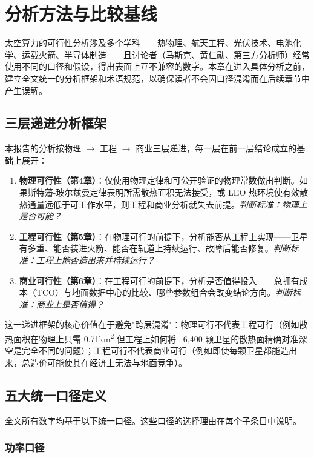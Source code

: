
\section{分析方法与比较基线}

太空算力的可行性分析涉及多个学科——热物理、航天工程、光伏技术、电池化学、运载火箭、半导体制造——且讨论者（马斯克、黄仁勋、第三方分析师）经常使用不同的口径和假设，得出表面上互不兼容的数字。本章在进入具体分析之前，建立全文统一的分析框架和术语规范，以确保读者不会因口径混淆而在后续章节中产生误解。

\subsection{三层递进分析框架}

本报告的分析按物理 $\to$ 工程 $\to$ 商业三层递进，每一层在前一层结论成立的基础上展开：

\begin{enumerate}[leftmargin=*]
    \item \textbf{物理可行性（第4章）}：仅使用物理定律和可公开验证的物理常数做出判断。如果斯特藩-玻尔兹曼定律表明所需散热面积无法接受，或 LEO 热环境使有效散热通量远低于可工作水平，则工程和商业分析就失去前提。\emph{判断标准：物理上是否可能？}
    \item \textbf{工程可行性（第5章）}：在物理可行的前提下，分析能否从工程上实现——卫星有多重、能否装进火箭、能否在轨道上持续运行、故障后能否修复。\emph{判断标准：工程上能否造出来并持续运行？}
    \item \textbf{商业可行性（第6章）}：在工程可行的前提下，分析是否值得投入——总拥有成本（TCO）与地面数据中心的比较、哪些参数组合会改变结论方向。\emph{判断标准：商业上是否值得？}
\end{enumerate}

这一递进框架的核心价值在于避免"跨层混淆"：物理可行不代表工程可行（例如散热面积在物理上只需 0.71\;km\textsuperscript{2} 但工程上如何将 ~6,400 颗卫星的散热面精确对准深空是完全不同的问题）；工程可行不代表商业可行（例如即使每颗卫星都能造出来，总造价可能使其在经济上无法与地面竞争）。

\subsection{五大统一口径定义}

全文所有数字均基于以下统一口径。这些口径的选择理由在每个子条目中说明。

\subsubsection{功率口径}

